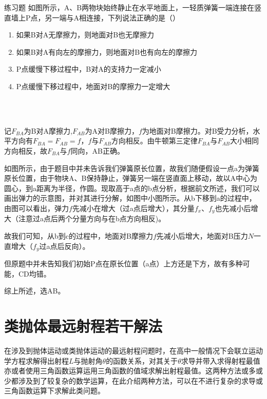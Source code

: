 \begin{ep}{练习题}{}
如图所示，A、B两物块始终静止在水平地面上，一轻质弹簧一端连接在竖直墙上P点，另一端与A相连接，下列说法正确的是（）

\begin{minipage}[b]{0.6\linewidth}
\begin{enumerate}[label=(\Alph*)]
  \item 如果B对A无摩擦力，则地面对B也无摩擦力
  \item 如果B对A有向左的摩擦力，则地面对B也有向左的摩擦力
  \item P点缓慢下移过程中，B对A的支持力一定减小
  \item P点缓慢下移过程中，地面对B的摩擦力一定增大
\end{enumerate}
\end{minipage}
\hfill
\begin{minipage}[b]{0.3\linewidth}

~\\

\end{minipage}
~\\

记$F_{BA}$为B对A摩擦力,$F_{AB}$为A对B摩擦力，$f$为地面对B摩擦力。对B受力分析，水平方向有$F_{BA}=F_{AB}=f$，$f$与$F_{AB}$方向相反。由牛顿第三定律$F_{BA}$与$F_{AB}$大小相同方向相反，故$F_{BA}$与$f$同向，AB正确。



如图所示，由于题目中并未告诉我们弹簧原长位置，故我们随便假设一点a为弹簧原长位置，由于物块A、B保持静止，弹簧另一端在竖直面上移动，故以A中心为圆心，到a距离为半径，作圆。现取高于a点的b点分析，根据前文所述，我们可以画出弹力的示意图，并对其进行分解，如图中小图所示。从b下移到a的过程中，由图可以看出，弹力$f$先减小在增大（过a点后增大），其分量$f_x$、$f_y$也先减小后增大（注意过a点后两个分量方向与在b点方向相反)。

故我们可知，从b到c的过程中，地面对B摩擦力$f$先减小后增大，地面对B压力$N$一直增大（$f_y$过a点后反向）。

但原题中并未告知我们初始P点在原长位置（a点）上方还是下方，故有多种可能，CD均错。

综上所述，选AB。
\end{ep}

\section{类抛体最远射程若干解法}

在涉及到抛体运动或类抛体运动的最远射程问题时，在高中一般情况下会联立运动学方程求解得出射程$L$与抛射角$\theta$的函数关系，对其关于$\theta$求导并带入求得射程最值亦或者使用三角函数运算运用三角函数的值域求解出射程最值。这两种方法或多或少都涉及到了较复杂的数学运算，在此介绍两种方法，可以在不进行复杂的求导或三角函数运算下求解此类问题。


